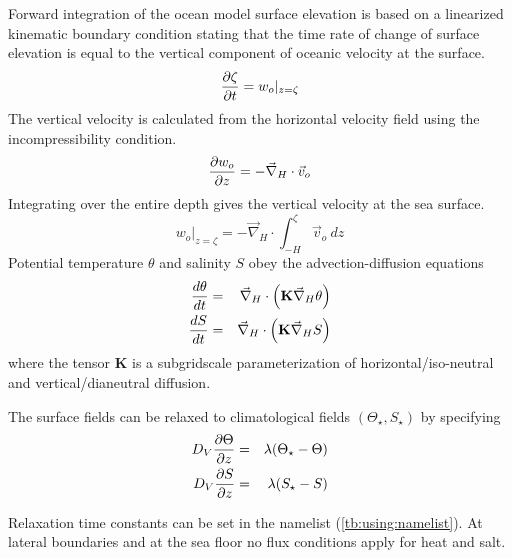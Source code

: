 Forward integration of the ocean model surface elevation
is based on a linearized kinematic boundary condition
stating that the time rate of change of surface elevation
is equal to the vertical component of oceanic velocity at
the surface.
\begin{equation}
\label{eqn:zeta1}
{\partial \zeta \over {\partial t}}=
w_o\vert_{z=\zeta}
\end{equation}
The vertical velocity is calculated from the horizontal
velocity field using the incompressibility condition.
\begin{equation}
{\partial w_o \over {\partial z}}= -{\vec\nabla}_{H}\cdot{\vec v_o}
\end{equation}
Integrating over the entire depth gives the
vertical velocity at the sea surface.
\begin{equation}
w_o\vert_{z=\zeta} =
-{\vec\nabla}_H\cdot\int_{-H}^{\zeta}{\vec v_o}\:dz
\end{equation}
Potential temperature $\theta$ and salinity $S$ obey the advection-diffusion equations
\begin{eqnarray}
\label{eqn:tempdiff}
{d{\theta}\over{dt}}
&=&
{\vec \nabla_{H}} \cdot \left( {\bf K} {\vec \nabla_{H}} \theta \right) \\
\label{eqn:saltdiff}
{dS\over{dt}}
&=&
{\vec \nabla_{H}} \cdot \left( {\bf K} {\vec \nabla_{H}} S \right)
\end{eqnarray}
where the tensor {\bf K} is a subgridscale parameterization
of horizontal/iso-neutral and vertical/dianeutral diffusion.

The  surface fields can be relaxed to climatological fields $(\Theta_\star, S_\star)$
by specifying
\begin{eqnarray}
\label{eqn:numeric:relaxation}
D_V{\partial\Theta\over{\partial z}}&=& \lambda (\Theta_\star - \Theta)\\
D_V{\partial S\over{\partial z}}&=& \lambda (S_\star - S)
\end{eqnarray}

Relaxation time constants can be set in the namelist (\ref{tb:using:namelist}).
At lateral boundaries and at the sea floor no flux conditions apply
for heat and salt.
